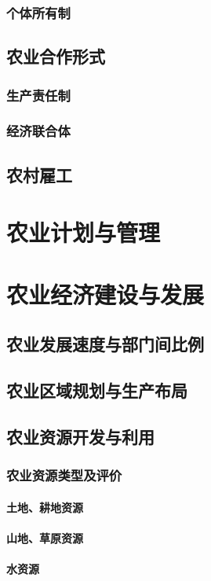 \documentclass[UTF8]{../../RepresentationUniverse}
\begin{document}
        \subsubsection{个体所有制}
    \subsection{农业合作形式}
        \subsubsection{生产责任制}
        \subsubsection{经济联合体}
    \subsection{农村雇工}

\section{农业计划与管理}
\section{农业经济建设与发展}
    \subsection{农业发展速度与部门间比例}
    \subsection{农业区域规划与生产布局}
    \subsection{农业资源开发与利用}
        \subsubsection{农业资源类型及评价}
            \paragraph{土地、耕地资源}
            \paragraph{山地、草原资源}
            \paragraph{水资源}
\end{document}
